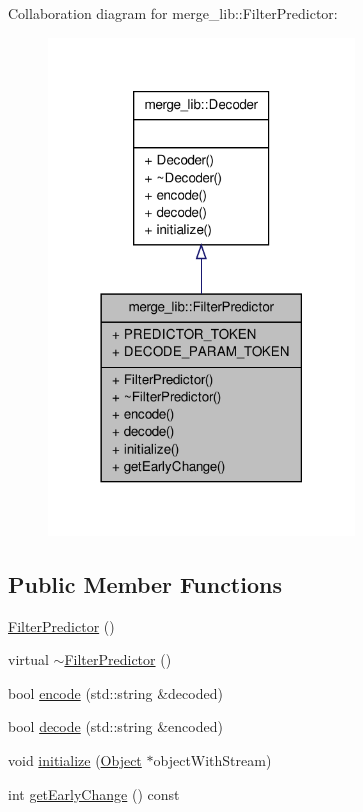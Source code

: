 Collaboration diagram for merge\-\_\-lib\-:\-:Filter\-Predictor\-:
\nopagebreak
\begin{figure}[H]
\begin{center}
\leavevmode
\includegraphics[width=230pt]{d4/d9b/classmerge__lib_1_1_filter_predictor__coll__graph}
\end{center}
\end{figure}
\subsection*{Public Member Functions}
\begin{DoxyCompactItemize}
\item 
\hyperlink{classmerge__lib_1_1_filter_predictor_a6d783e05ed476f3b324ad5b889c37ec0}{Filter\-Predictor} ()
\item 
virtual \hyperlink{classmerge__lib_1_1_filter_predictor_a88377957dc1154c2cb4105c8d5c66e87}{$\sim$\-Filter\-Predictor} ()
\item 
bool \hyperlink{classmerge__lib_1_1_filter_predictor_aaac46646b5ba5e0e0ba7888baa02bf7d}{encode} (std\-::string \&decoded)
\item 
bool \hyperlink{classmerge__lib_1_1_filter_predictor_a1b9360122a5f9ad101a11614029da051}{decode} (std\-::string \&encoded)
\item 
void \hyperlink{classmerge__lib_1_1_filter_predictor_ab45acfb2cd146059037a607f4d008df7}{initialize} (\hyperlink{classmerge__lib_1_1_object}{Object} $\ast$object\-With\-Stream)
\item 
int \hyperlink{classmerge__lib_1_1_filter_predictor_ab633eb1564a580644998e42bb429e4ef}{get\-Early\-Change} () const 
\end{DoxyCompactItemize}
